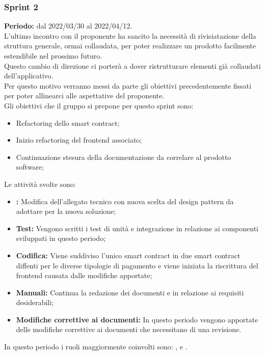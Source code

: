 \subsubsection{Sprint 2} \label{subsubsection:sprint_2}
\textbf{Periodo:} dal 2022/03/30 al 2022/04/12.
\bigskip
\\L'ultimo incontro con il proponente ha sancito la necessità di rivisiatazione della struttura generale, ormai collaudata, per poter realizzare un prodotto facilmente estendibile nel prossimo futuro.
\\Questo cambio di direzione ci porterà a dover ristrutturare elementi già collaudati dell'applicativo.
\\Per questo motivo verranno messi da parte gli obiettivi precedentemente fissati per poter allinearci alle aspettative del proponente.
\\Gli obiettivi che il gruppo si prepone per questo sprint\glo{} sono:
\begin{itemize}
  \item Refactoring dello smart contract\glo{};
  \item Inizio refactoring\glo{} del frontend\glo{} associato;
  \item Continuazione stesura della documentazione da correlare al prodotto software;
\end{itemize}
Le attività svolte sono:
\begin{itemize}
  \item \textbf{\PB{}:} Modifica dell’allegato tecnico con nuova scelta del design pattern da adottare per la nuova soluzione;
  \item \textbf{Test:} Vengono scritti i test di unità e integrazione in relazione ai componenti sviluppati in questo periodo;
  \item \textbf{Codifica:} Viene suddiviso l'unico smart contract\glo{} in due smart contract\glo{} diffenti per le diverse tipologie di pagamento e viene iniziata la riscrittura del frontend\glo{} causata dalle modifiche apportate;
  \item \textbf{Manuali:} Continua la redazione dei documenti \docNameVersionMU{} e \docNameVersionMS{} in relazione ai requisiti desiderabili;
  \item \textbf{Modifiche correttive ai documenti:} In questo periodo vengono apportate delle modifiche correttive ai documenti che necessitano di una revisione.
\end{itemize}
In questo periodo i ruoli maggiormente coinvolti sono: \roleDesignerLow{}, \roleProgrammerLow{} e \roleVerifierLow{}.
